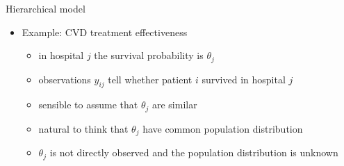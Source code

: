 \documentclass[finnish,english,t]{beamer}
\begin{document}
\begin{frame}{Hierarchical model}

  \begin{itemize}
  \item Example: CVD treatment effectiveness
    \begin{itemize}
    \item in hospital $j$ the survival probability is $\theta_j$
    \item observations $y_{ij}$ tell whether patient $i$ survived in
      hospital $j$
        \begin{xy}
        \end{xy}
        \pause
      \item sensible to assume that $\theta_j$ are similar
        \begin{xy}
        \end{xy}
      \item natural to think that $\theta_j$ have common population distribution
      \item $\theta_j$ is not directly observed and the population
        distribution is unknown
    \end{itemize}
  \end{itemize}
\end{frame}
\end{document}
